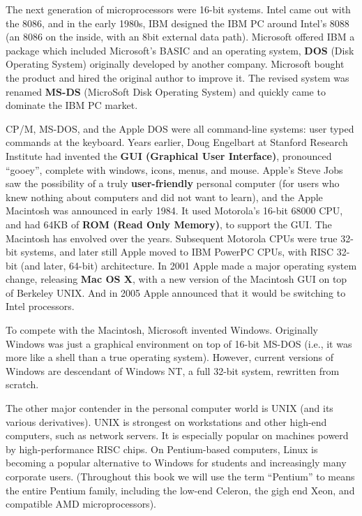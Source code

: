 \documentclass{book}
\newcommand {\kw}  [1] {\textbf{#1}}
\begin{document}
The next generation of microprocessors were 16-bit systems.
Intel came out with the 8086, and in the early 1980s, IBM designed the IBM PC around Intel's 8088 (an 8086 on the inside, with an 8bit external data path).
Microsoft offered IBM a package which included Microsoft's BASIC and an operating system, 
\kw{DOS} (Disk Operating System) originally developed by another company.
Microsoft bought the product and hired the original author to improve it.
The revised system was renamed \kw{MS-DS} (MicroSoft Disk Operating System) and quickly came to dominate the IBM PC market.

CP/M, MS-DOS, and the Apple DOS were all command-line systems: user typed commands at the keyboard.
Years earlier, Doug Engelbart at Stanford Research Institute had invented the \kw{GUI (Graphical User Interface)}, pronounced ``gooey'', 
complete with windows, icons, menus, and mouse.
Apple's Steve Jobs saw the possibility of a truly \kw{user-friendly} personal computer 
(for users who knew nothing about computers and did not want to learn), and the Apple Macintosh was announced in early 1984.
It used Motorola's 16-bit 68000 CPU, and had 64KB of \kw{ROM (Read Only Memory)}, to support the GUI.
The Macintosh has envolved over the years.
Subsequent Motorola CPUs were true 32-bit systems, and later still Apple moved to IBM PowerPC CPUs, with RISC 32-bit (and later, 64-bit) architecture.
In 2001 Apple made a major operating system change, releasing \kw{Mac OS X}, with a new version of the Macintosh GUI on top of Berkeley UNIX.
And in 2005 Apple announced that it would be switching to Intel processors.

To compete with the Macintosh, Microsoft invented Windows.
Originally Windows was just a graphical environment on top of 16-bit MS-DOS (i.e., it was more like a shell than a true operating system).
However, current versions of Windows are descendant of Windows NT, a full 32-bit system, rewritten from scratch.

The other major contender in the personal computer world is UNIX (and its various derivatives).
UNIX is strongest on workstations and other high-end computers, such as network servers.
It is especially popular on machines powerd by high-performance RISC chips.
On Pentium-based computers, Linux is becoming a popular alternative to Windows for students and increasingly many corporate users.
(Throughout this book we will use the term ``Pentium'' to means the entire Pentium family, 
including the low-end Celeron, the gigh end Xeon, and compatible AMD microprocessors).
\end{document}

